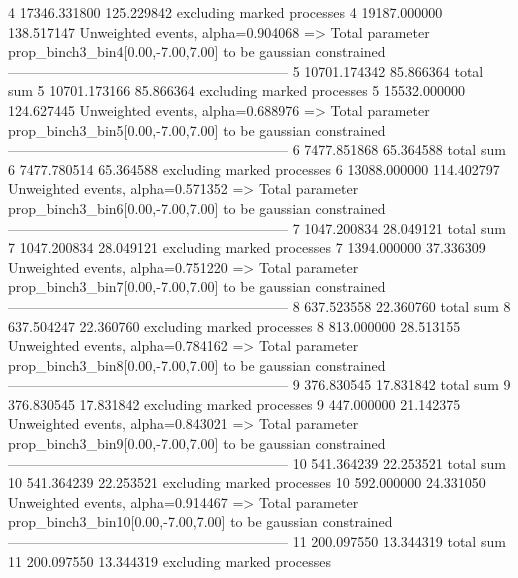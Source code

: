 4          17346.331800    125.229842      excluding marked processes    
4          19187.000000    138.517147      Unweighted events, alpha=0.904068
  => Total parameter prop_binch3_bin4[0.00,-7.00,7.00] to be gaussian constrained
------------------------------------------------------------
5          10701.174342    85.866364       total sum                     
5          10701.173166    85.866364       excluding marked processes    
5          15532.000000    124.627445      Unweighted events, alpha=0.688976
  => Total parameter prop_binch3_bin5[0.00,-7.00,7.00] to be gaussian constrained
------------------------------------------------------------
6          7477.851868     65.364588       total sum                     
6          7477.780514     65.364588       excluding marked processes    
6          13088.000000    114.402797      Unweighted events, alpha=0.571352
  => Total parameter prop_binch3_bin6[0.00,-7.00,7.00] to be gaussian constrained
------------------------------------------------------------
7          1047.200834     28.049121       total sum                     
7          1047.200834     28.049121       excluding marked processes    
7          1394.000000     37.336309       Unweighted events, alpha=0.751220
  => Total parameter prop_binch3_bin7[0.00,-7.00,7.00] to be gaussian constrained
------------------------------------------------------------
8          637.523558      22.360760       total sum                     
8          637.504247      22.360760       excluding marked processes    
8          813.000000      28.513155       Unweighted events, alpha=0.784162
  => Total parameter prop_binch3_bin8[0.00,-7.00,7.00] to be gaussian constrained
------------------------------------------------------------
9          376.830545      17.831842       total sum                     
9          376.830545      17.831842       excluding marked processes    
9          447.000000      21.142375       Unweighted events, alpha=0.843021
  => Total parameter prop_binch3_bin9[0.00,-7.00,7.00] to be gaussian constrained
------------------------------------------------------------
10         541.364239      22.253521       total sum                     
10         541.364239      22.253521       excluding marked processes    
10         592.000000      24.331050       Unweighted events, alpha=0.914467
  => Total parameter prop_binch3_bin10[0.00,-7.00,7.00] to be gaussian constrained
------------------------------------------------------------
11         200.097550      13.344319       total sum                     
11         200.097550      13.344319       excluding marked processes    
